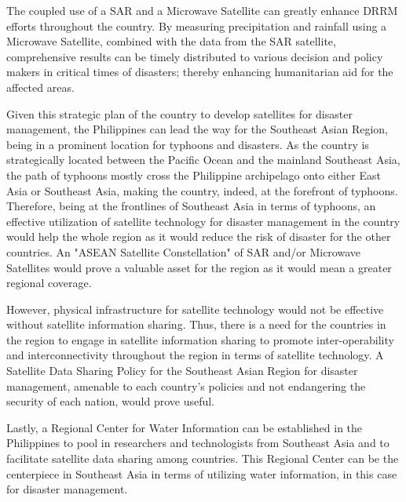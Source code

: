 {\vspace{0.4 cm}
  
The coupled use of a SAR and a Microwave Satellite can greatly enhance DRRM efforts throughout the country. By measuring precipitation and rainfall using a Microwave Satellite, combined with the data from the SAR satellite, comprehensive results can be timely distributed to various decision and policy makers in critical times of disasters; thereby enhancing humanitarian aid for the affected areas.
		
\vspace{0.4 cm}
  
Given this strategic plan of the country to develop satellites for disaster management, the Philippines can lead the way for the Southeast Asian Region, being in a prominent location for typhoons and disasters. As the country is strategically located between the Pacific Ocean and the mainland Southeast Asia, the path of typhoons mostly cross the Philippine archipelago onto either East Asia or Southeast Asia, making the country, indeed, at the forefront of typhoons. Therefore, being at the frontlines of Southeast Asia in terms of typhoons, an effective utilization of satellite technology for disaster management in the country would help the whole region as it would reduce the risk of disaster for the other countries. An "ASEAN Satellite Constellation" of SAR and/or Microwave Satellites would prove a valuable asset for the region as it would mean a greater regional coverage.
		
\vspace{0.4 cm}
  
However, physical infrastructure for satellite technology would not be effective without satellite information sharing. Thus, there is a need for the countries in the region to engage in satellite information sharing to promote inter-operability and interconnectivity throughout the region in terms of satellite technology. A Satellite Data Sharing Policy for the Southeast Asian Region for disaster management, amenable to each country's policies and not endangering the security of each nation, would prove useful.
		
\vspace{0.4 cm}
  
Lastly, a Regional Center for Water Information can be established in the Philippines to pool in researchers and technologists from Southeast Asia and to facilitate satellite data sharing among countries. This Regional Center can be the centerpiece in Southeast Asia in terms of utilizing water information, in this case for disaster management. 
		
}
